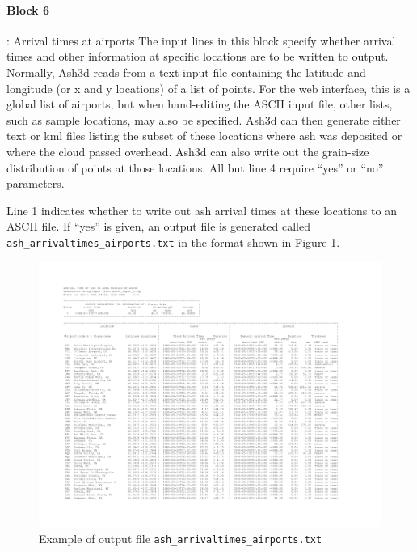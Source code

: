 \paragraph{Block 6}: Arrival times at airports
The input lines in this block specify whether arrival times and other information
at specific locations are to be written to output. Normally, Ash3d reads from a
text input file containing the latitude and longitude (or x and y locations) of
a list of points. For the web interface, this is a global list of airports, but
when hand-editing the ASCII input file, other lists, such as sample locations, may
also be specified. Ash3d can then generate either text or kml files listing the
subset of these locations where ash was deposited or where the cloud passed overhead.
Ash3d can also write out the grain-size distribution of points at those locations.
All but line 4 require ``yes'' or ``no'' parameters.

Line 1 indicates whether to write out ash arrival times at these locations to an
ASCII file. If ``yes'' is given, an output file is generated called
\texttt{ash\_arrivaltimes\_airports.txt}
in the format shown in Figure \ref{FigAshArrivTimeFormat}.

\begin{figure}[htbp]\vspace*{-5cm}\hspace*{-2cm}
\includegraphics[angle=90,scale=0.9]{Figures/Chap_Usage_asharrivaltimesairports_p1.pdf}
\parbox{15cm}{\caption{\label{FigAshArrivTimeFormat}
Example of output file \texttt{ash\_arrivaltimes\_airports.txt}
}}
\end{figure}

